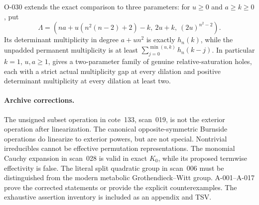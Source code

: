 O-030 extends the exact comparison to three parameters:
for \(u\geq0\) and \(a\geq k\geq0\), put
\[
 \Lambda=(na+u(n^2(n-2)+2)-k,\ 2u+k,\ (2u)^{n^2-2}).
\]
Its determinant multiplicity in degree \(a+un^2\) is exactly
\(h_n(k)\), while the unpadded permanent multiplicity is at least
\(\sum_{j=0}^{\min(u,k)}h_n(k-j)\).
In particular \(k=1\), \(u,a\geq1\), gives a two-parameter
family of genuine relative-saturation holes, each with a strict
actual multiplicity gap at every dilation and positive determinant
multiplicity at every dilation at least two.

\paragraph{Archive corrections.}
The unsigned subset operation in cote~133, scan~019, is not the
exterior operation after linearization. The canonical opposite-symmetric
Burnside operations do linearize to exterior powers, but are not
special. Nontrivial irreducibles cannot be effective permutation
representations. The monomial Cauchy expansion in scan~028 is valid
in exact \(K_0\), while its proposed termwise effectivity is false.
The literal split quadratic group in scan~006 must be distinguished
from the modern metabolic Grothendieck--Witt group. A-001--A-017
prove the corrected statements or provide the explicit counterexamples.
The exhaustive assertion inventory is included as an appendix and TSV.

